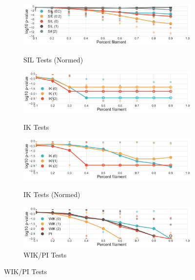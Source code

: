 \documentclass[12pt]{article}
\begin{document}
\begin{description}
\begin{center}
\begin{figure}[htp!]
\begin{subfigure}{.45\textwidth}
        \label{fig:all_silh}
      \end{subfigure}
      \begin{subfigure}{.45\textwidth}
        \centering
        \caption{SIL Tests (Normed)}
        \includegraphics[width=\linewidth]{figure_8_all_silhouette_group_normed.pdf}
        \label{fig:all_silh_normed_normed}
      \end{subfigure}
      \begin{subfigure}{.45\textwidth}
        \centering
        \caption{IK Tests}
        \includegraphics[width=\linewidth]{figure_8_all_contour_group.pdf}
        \label{fig:all_contour}
      \end{subfigure}
      \begin{subfigure}{.45\textwidth}
        \centering
        \caption{IK Tests (Normed)}
        \includegraphics[width=\linewidth]{figure_8_all_contour_group_normed.pdf}
        \label{fig:all_contour_normed}
      \end{subfigure}
      \begin{subfigure}{.45\textwidth}
        \centering
        \caption{WIK/PI Tests}
        \includegraphics[width=\linewidth]{figure_8_all_weighted_contour_group.pdf}

\end{subfigure}
\end{figure}
\end{center}
\end{description}
\end{document}
